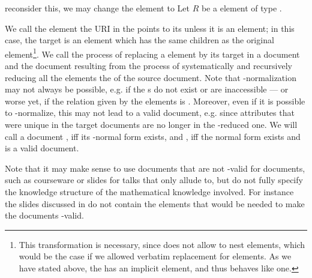 \begin{omgroup}[id=omdoc-infrastructure,short=Document Infrastructure]
\begin{module}[id=sharing]
\begin{omgroup}[id=sharing,short=Sharing Document Parts]
\begin{oldpart}{reconsider this, we may change the {} element to
    {}}
  Let $R$ be a {} element of type {}.
  \begin{definition}[display=flow,id=ref-target.def]
    We call the element the URI in the {} points to its
    {} unless it is an {} element; in this case,
    the target is an {} element which has the same children as the original
    {} element\footnote{This transformation is necessary, since {\omdoc}
      does not allow to nest {} elements, which would be the case if we
      allowed verbatim replacement for {} elements. As we have stated
      above, the {} has an implicit {} element, and thus
      behaves like one.}.  We call the process of replacing a {} element by
    its target in a document {} and the document resulting from
    the process of systematically and recursively reducing all the {}
    elements the {} of the source document. Note that
    {}-normalization may not always be possible, e.g.  if the
    {s} do not exist or are inaccessible --- or worse yet, if the
    relation given by the {} elements is {}. Moreover, even
    if it is possible to {}-normalize, this may not lead to a valid {\omdoc}
    document, e.g.  since  attributes that were
    unique in the target documents are no longer in the {}-reduced one. We
    will call a document {}, iff its {}-normal form
    exists, and {}, iff the {} normal form exists and is
    a valid {\omdoc} document.
  \end{definition}
\end{oldpart}
  
Note that it may make sense to use documents that are not {}-valid for
{} documents, such as courseware or slides for talks that
only allude to, but do not fully specify the knowledge structure of the mathematical
knowledge involved. For instance the slides discussed in {}
do not contain the {} elements that would be needed to make the documents
{}-valid.


\end{omgroup}
\end{module}
\end{omgroup}
